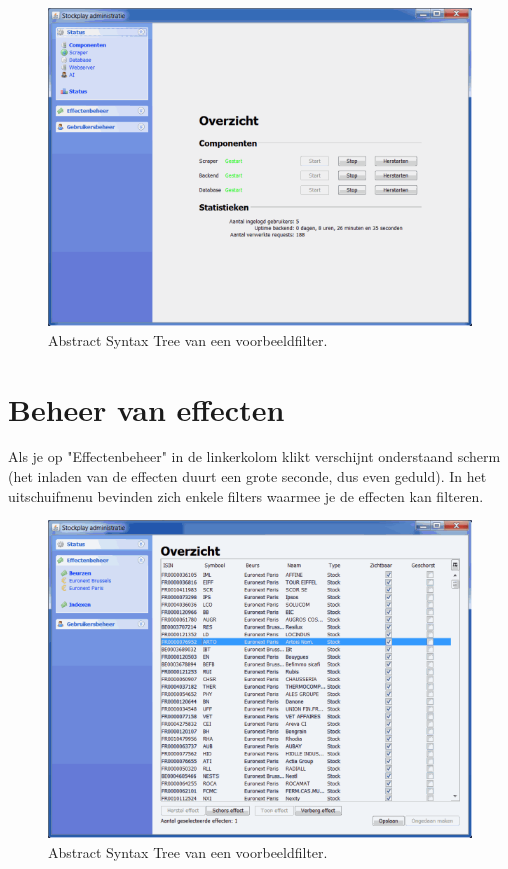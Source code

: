 \begin{figure}[h!]
	\centering
		\includegraphics[width=\textwidth]{images/handleiding/handleiding7.gif}
	\caption{Abstract Syntax Tree van een voorbeeldfilter.}
\end{figure}

\section{Beheer van effecten}

Als je op "Effectenbeheer" in de linkerkolom klikt verschijnt onderstaand scherm (het inladen van de effecten duurt een grote seconde, dus even geduld). 
In het uitschuifmenu bevinden zich enkele filters waarmee je de effecten kan filteren.

\begin{figure}[h!]
	\centering
		\includegraphics[width=\textwidth]{images/handleiding/handleiding6.gif}
	\caption{Abstract Syntax Tree van een voorbeeldfilter.}
\end{figure}

